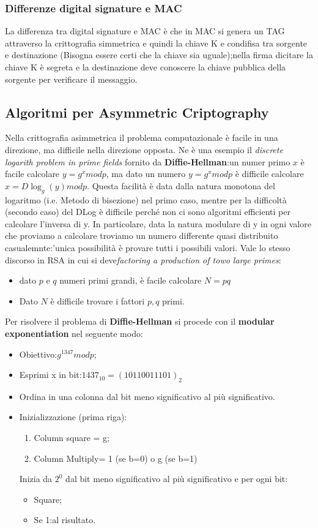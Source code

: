 \documentclass{book}
\theoremstyle{remark}
\begin{document}
\subsubsection{Differenze digital signature e MAC}
La differenza tra digital signature e MAC è che in MAC si genera un TAG attraverso la crittografia simmetrica e quindi la chiave K e condifisa tra sorgente e destinazione (Bisogna essere certi che la chiave sia uguale);\@mentre nella firma dicitare la chiave K è segreta e la destinazione deve conoscere la chiave pubblica della sorgente per verificare il messaggio\@.
\subsection{Algoritmi per Asymmetric Criptography}
Nella crittografia asimmetrica il problema computazionale è facile in una direzione, ma difficile nella direzione opposta\@. Ne è una esempio il \emph{discrete logarith problem in prime fields} fornito da \textbf{Diffie-Hellman}:\@Dato un numer primo \(x\) è facile calcolare \(y=g^x mod p\), ma dato un numero \(y=g^x mod p\) è difficile calcolare \(x=D\log_{g}(y) mod p\)\@. Questa facilità è data dalla natura monotona del logaritmo (i\@.e\@. Metodo di bisezione) nel primo caso, mentre per la difficoltà (secondo caso) del DLog è difficile perché non ci sono algoritmi efficienti per calcolare l'inversa di y\@. In particolare, data la natura modulare di y in ogni valore che proviamo a calcolare troviamo un numero differente quasi distribuito casualemnte:\@l'unica possibilità è provare tutti i possibili valori\@.\newline
Vale lo stesso discorso in RSA in cui si deve\emph{factoring a production of towo large primes}:\begin{itemize}
	\item dato \(p\) e \(q\) numeri primi grandi, è facile calcolare \(N=pq\)
	\item Dato \(N\) è difficile trovare i fattori \(p,q\) primi\@.
\end{itemize}
Per risolvere il problema di \textbf{Diffie-Hellman} si procede con il \textbf{modular exponentiation} nel seguente modo:\begin{itemize}
	\item Obiettivo:\@calcolare \(g^{1347}mod p\);\@
	\item Esprimi x in bit:\@\(1437_{10}=(10110011101)_2\)
	\item Ordina in una colonna dal bit meno significativo al più significativo\@.
	\item Inizializzazione (prima riga):\begin{enumerate}
		      \item Column square = g;\@
		      \item Column Multiply= 1 (se b=0) o g (se b=1)
	      \end{enumerate}
	      Inizia da \(2^0\) dal bit meno significativo al più significativo e per ogni bit:\begin{itemize}
		      \item Square;\@
		      \item Se 1:\@moltiplica al risultato\@.
	      \end{itemize}
\end{itemize}
\end{document}

